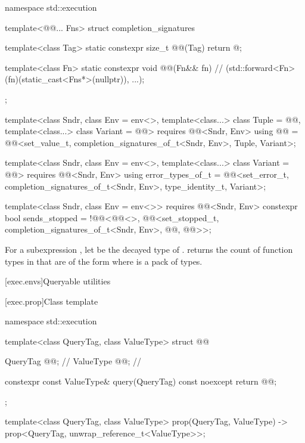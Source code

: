 \pnum
{}%
%
%
\begin{codeblock}
namespace std::execution {
  template<@@... Fns>
    struct completion_signatures {
      template<class Tag>
        static constexpr size_t @@(Tag) { return @\seebelow@; }

      template<class Fn>
        static constexpr void @@(Fn&& fn) {               // \expos
          (std::forward<Fn>(fn)(static_cast<Fns*>(nullptr)), ...);
        }
    };

  template<class Sndr, class Env = env<>,
           template<class...> class Tuple = @@,
           template<class...> class Variant = @@>
      requires @@<Sndr, Env>
    using @@ =
      @@<set_value_t, completion_signatures_of_t<Sndr, Env>, Tuple, Variant>;

  template<class Sndr, class Env = env<>,
           template<class...> class Variant = @@>
      requires @@<Sndr, Env>
    using error_types_of_t =
      @@<set_error_t, completion_signatures_of_t<Sndr, Env>,
                        type_identity_t, Variant>;

  template<class Sndr, class Env = env<>>
      requires @@<Sndr, Env>
    constexpr bool sends_stopped =
      !@@<@@<>,
               @@<set_stopped_t, completion_signatures_of_t<Sndr, Env>,
                                 @@, @@>>;
}
\end{codeblock}

\pnum
For a subexpression ,
let  be the decayed type of .
returns the count of function types in  that
are of the form  where  is a pack of types.

[exec.envs]{Queryable utilities}

[exec.prop]{Class template }

\begin{codeblock}
namespace std::execution {
  template<class QueryTag, class ValueType>
  struct @@ {
    QueryTag @@;            // \expos
    ValueType @@;           // \expos

    constexpr const ValueType& query(QueryTag) const noexcept {
      return @@;
    }
  };

  template<class QueryTag, class ValueType>
    prop(QueryTag, ValueType) -> prop<QueryTag, unwrap_reference_t<ValueType>>;
}
\end{codeblock}

